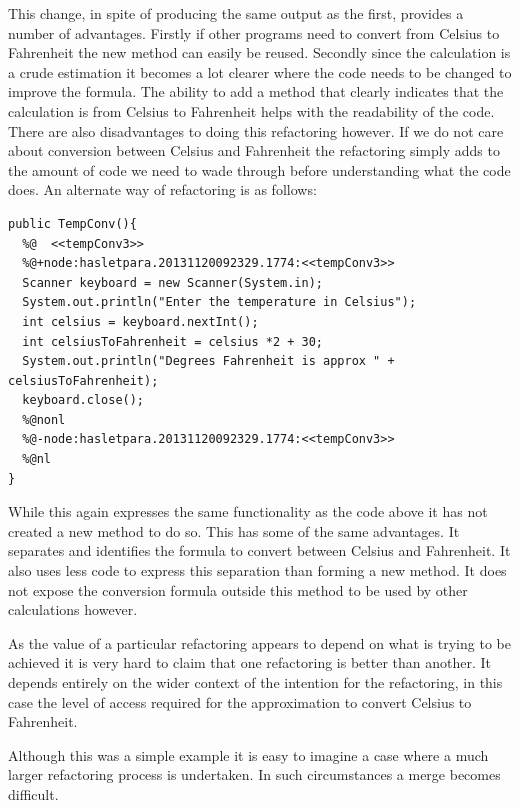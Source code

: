 \documentclass[12pt]{CRPITStyle}
\begin{document}
This change, in spite of producing the same output as the first, provides a number of advantages. Firstly if other programs need to convert from Celsius to Fahrenheit the new method can easily be reused. Secondly since the calculation is a crude estimation it becomes a lot clearer where the code needs to be changed to improve the formula. The ability to add a method that clearly indicates that the calculation is from Celsius to Fahrenheit helps with the readability of the code. There are also disadvantages to doing this refactoring however. If we do not care about conversion between Celsius and Fahrenheit the refactoring simply adds to the amount of code we need to wade through before understanding what the code does. An alternate way of refactoring is as follows:

\begin{verbatim}
public TempConv(){
  %@  <<tempConv3>>
  %@+node:hasletpara.20131120092329.1774:<<tempConv3>>
  Scanner keyboard = new Scanner(System.in);
  System.out.println("Enter the temperature in Celsius");
  int celsius = keyboard.nextInt();
  int celsiusToFahrenheit = celsius *2 + 30;
  System.out.println("Degrees Fahrenheit is approx " + celsiusToFahrenheit);
  keyboard.close();
  %@nonl
  %@-node:hasletpara.20131120092329.1774:<<tempConv3>>
  %@nl
}
\end{verbatim}

While this again expresses the same functionality as the code above it has not created a new method to do so. This has some of the same advantages. It separates and identifies the formula to convert between Celsius and Fahrenheit. It also uses less code to express this separation than forming a new method. It does not expose the conversion formula outside this method to be used by other calculations however.

As the value of a particular refactoring appears to depend on what is trying to be achieved it is very hard to claim that one refactoring is better than another. It depends entirely on the wider context of the intention for the refactoring, in this case the level of access required for the approximation to convert Celsius to Fahrenheit.

Although this was a simple example it is easy to imagine a case where a much larger refactoring process is undertaken. In such circumstances a merge becomes difficult. 
\end{document}
